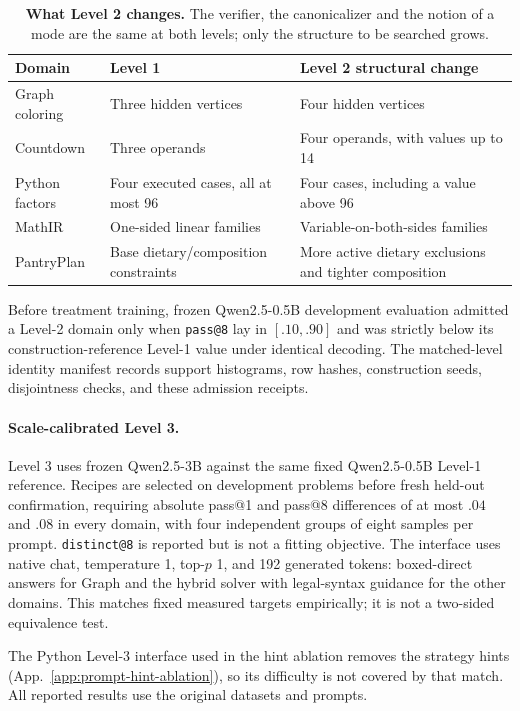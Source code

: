 \documentclass{article}
\makeatletter
\newcommand{\1}{\mathbf 1}
\newcommand{\distk}{\texttt{distinct@8}}
\theoremstyle{remark}
\theoremstyle{definition}
\theoremstyle{plain}
\makeatother
\begin{document}
\begin{table}[H]
\centering
\caption{\textbf{What Level 2 changes.} The verifier, the canonicalizer and the
notion of a mode are the same at both levels; only the structure to be searched
grows.}
\label{tab:level2-structure}
\small
\begin{tabularx}{.96\linewidth}{@{}lYY@{}}
\toprule
\textbf{Domain} & \textbf{Level 1} & \textbf{Level 2 structural change} \\
\midrule
Graph coloring & Three hidden vertices & Four hidden vertices \\
Countdown & Three operands & Four operands, with values up to 14 \\
Python factors & Four executed cases, all at most 96 & Four cases, including a value above 96 \\
MathIR & One-sided linear families & Variable-on-both-sides families \\
PantryPlan & Base dietary/composition constraints & More active dietary exclusions and tighter composition \\
\bottomrule
\end{tabularx}
\end{table}

Before treatment training, frozen Qwen2.5-0.5B development evaluation admitted
a Level-2 domain only when \texttt{pass@8} lay in $[.10,.90]$ and was strictly below
its construction-reference Level-1 value under identical decoding. The matched-level
identity manifest records support histograms, row hashes, construction
seeds, disjointness checks, and these admission receipts.


\paragraph{Scale-calibrated Level 3.}
Level 3 uses frozen Qwen2.5-3B against the same fixed Qwen2.5-0.5B Level-1
reference. Recipes are selected on development problems before fresh held-out
confirmation, requiring absolute pass@1 and pass@8 differences of at most
$.04$ and $.08$ in every domain, with four independent groups of eight samples
per prompt. \distk{} is reported but is not a fitting objective. The
interface uses native chat, temperature 1, top-$p$ 1, and 192 generated
tokens: boxed-direct answers for Graph and the hybrid solver with
legal-syntax guidance for the other domains. This matches fixed measured
targets empirically; it is not a two-sided equivalence test.

The Python Level-3 interface used in the hint ablation removes the strategy
hints (App.~\ref{app:prompt-hint-ablation}), so its difficulty is not
covered by that match. All reported results use the original datasets and
prompts.
\end{document}
